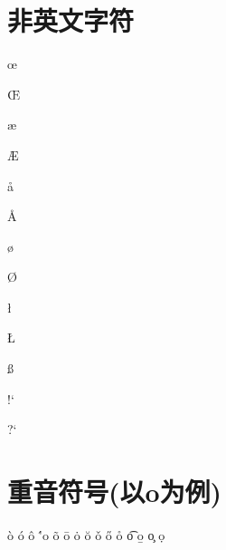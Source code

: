 \documentclass{article}
\begin{document}
	\section{非英文字符}
	\oe
	
	\OE
	
	\ae
	
	\AE
	
	\aa
	
	\AA
	
	\o
	
	\O
	
	\l
	
	\L
	
	\ss
	
	\SS
	
	!`
	
	?`
	
	\section{重音符号(以o为例)}
	\`o 
	\'o 
	\^o 
	\''o 
	\~o 
	\=o 
	\.o 
	\u{o}
	\v{o}
	\H{o}
	\r{o}
	\t{o}
	\b{o}
	\c{o}
	\d{o}
\end{document}
